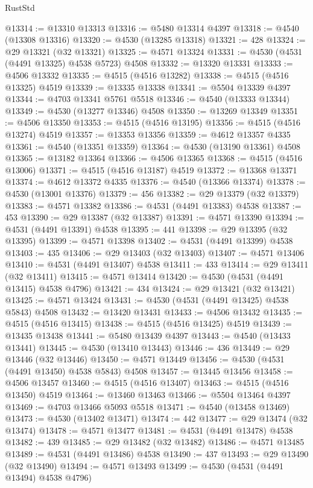 \begin{lexlean}{RustStd}
\begin{coremodule}
{\begin{coremodule}
{{{{{{{{{{{{{{{{{{{{{{{{{{{{{{{{{{{{{{{{{{{{{{{{{{{{{{{@13314 := @13310 @13313
@13316 := @5480 @13314 @4397
@13318 := @4540 (@13308 @13316)
@13320 := @4530 (@13285 @13318)
@13321 := 428
@13324 := @29 @13321 (@32 @13321)
@13325 := @4571 @13324
@13331 := @4530 (@4531 (@4491 @13325) @4538 @5723) @4508
@13332 := @13320 @13331
@13333 := @4506 @13332
@13335 := @4515 (@4516 @13282)
@13338 := @4515 (@4516 @13325) @4519
@13339 := @13335 @13338
@13341 := @5504 @13339 @4397
@13344 := @4703 @13341 @5761 @5518
@13346 := @4540 (@13333 @13344)
@13349 := @4530 (@13277 @13346) @4508
@13350 := @13269 @13349
@13351 := @4506 @13350
@13353 := @4515 (@4516 @13195)
@13356 := @4515 (@4516 @13274) @4519
@13357 := @13353 @13356
@13359 := @4612 @13357 @4335
@13361 := @4540 (@13351 @13359)
@13364 := @4530 (@13190 @13361) @4508
@13365 := @13182 @13364
@13366 := @4506 @13365
@13368 := @4515 (@4516 @13006)
@13371 := @4515 (@4516 @13187) @4519
@13372 := @13368 @13371
@13374 := @4612 @13372 @4335
@13376 := @4540 (@13366 @13374)
@13378 := @4530 (@13001 @13376)
@13379 := 456
@13382 := @29 @13379 (@32 @13379)
@13383 := @4571 @13382
@13386 := @4531 (@4491 @13383) @4538
@13387 := 453
@13390 := @29 @13387 (@32 @13387)
@13391 := @4571 @13390
@13394 := @4531 (@4491 @13391) @4538
@13395 := 441
@13398 := @29 @13395 (@32 @13395)
@13399 := @4571 @13398
@13402 := @4531 (@4491 @13399) @4538
@13403 := 435
@13406 := @29 @13403 (@32 @13403)
@13407 := @4571 @13406
@13410 := @4531 (@4491 @13407) @4538
@13411 := 433
@13414 := @29 @13411 (@32 @13411)
@13415 := @4571 @13414
@13420 := @4530 (@4531 (@4491 @13415) @4538 @4796)
@13421 := 434
@13424 := @29 @13421 (@32 @13421)
@13425 := @4571 @13424
@13431 := @4530 (@4531 (@4491 @13425) @4538 @5843) @4508
@13432 := @13420 @13431
@13433 := @4506 @13432
@13435 := @4515 (@4516 @13415)
@13438 := @4515 (@4516 @13425) @4519
@13439 := @13435 @13438
@13441 := @5480 @13439 @4397
@13443 := @4540 (@13433 @13441)
@13445 := @4530 (@13410 @13443)
@13446 := 436
@13449 := @29 @13446 (@32 @13446)
@13450 := @4571 @13449
@13456 := @4530 (@4531 (@4491 @13450) @4538 @5843) @4508
@13457 := @13445 @13456
@13458 := @4506 @13457
@13460 := @4515 (@4516 @13407)
@13463 := @4515 (@4516 @13450) @4519
@13464 := @13460 @13463
@13466 := @5504 @13464 @4397
@13469 := @4703 @13466 @5093 @5518
@13471 := @4540 (@13458 @13469)
@13473 := @4530 (@13402 @13471)
@13474 := 442
@13477 := @29 @13474 (@32 @13474)
@13478 := @4571 @13477
@13481 := @4531 (@4491 @13478) @4538
@13482 := 439
@13485 := @29 @13482 (@32 @13482)
@13486 := @4571 @13485
@13489 := @4531 (@4491 @13486) @4538
@13490 := 437
@13493 := @29 @13490 (@32 @13490)
@13494 := @4571 @13493
@13499 := @4530 (@4531 (@4491 @13494) @4538 @4796)
}}}}}}}}}}}}}}}}}}}}}}}}}}}}}}}}}}}}}}}}}}}}}}}}}}}}}}}
\end{coremodule}}
\end{coremodule}
\end{lexlean}

